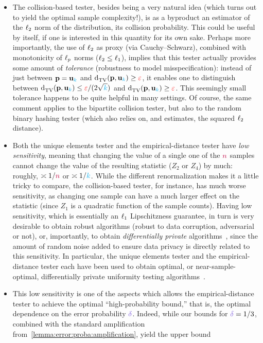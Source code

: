 \begin{itemize}
  \item The collision-based tester, besides being a very natural idea (which turns out to yield the optimal sample complexity!), is as a byproduct an estimator of the $\lp[2]$ norm of the distribution, \ie  its collision probability. This could be useful by itself, if one is interested in this quantity for its own sake. Perhaps more importantly, the use of $\lp[2]$ as proxy (via Cauchy--Schwarz), combined with monotonicity of $\lp[p]$ norms ($\lp[2]\leq \lp[1]$), implies that this tester actually provides some amount of \emph{tolerance} (robustness to model misspecification): instead of just between $\p=\uniform_\ab$ and $\totalvardist{\p}{\uniform_\ab} \geq \dst$, it enables one to distinguish between $\totalvardist{\p}{\uniform_\ab} \leq \dst/(2\sqrt{\ab})$ and $\totalvardist{\p}{\uniform_\ab} \geq \dst$. This seemingly small tolerance happens to be quite helpful in many settings. Of course, the same comment applies to the bipartite collision tester, but also to the random binary hashing tester (which also relies on, and estimates, the squared $\lp[2]$ distance).
  \item Both the unique elements tester and the empirical-distance tester have \emph{low sensitivity}, meaning that changing the value of a single one of the $\ns$ samples cannot change the value of the resulting statistic ($Z_2$ or $Z_4$) by much: roughly, $\asymp 1/\ns$ or $\asymp 1/\ab$. While the different renormalization makes it a little tricky to compare, the collision-based tester, for instance, has much worse sensitivity, as changing one sample can have a much larger effect on the statistic (since $Z_1$ is a quadratic function of the sample counts). Having low sensitivity, which is essentially an $\lp[1]$ Lipschitzness guarantee, in turn is very desirable to obtain robust algorithms (\ie robust to data corruption, adversarial or not), or, importantly, to obtain \emph{differentially private} algorithms~\citep{DworkMNS06}, since the amount of random noise added to ensure data privacy is directly related to this sensitivity. In particular, the unique elements tester and the empirical-distance tester each have been used to obtain optimal, or near-sample-optimal, differentially private uniformity testing algorithms~\citep{AcharyaSZ18,AliakbarpourDR18}.
  \item This low sensitivity is one of the aspects which allows the empirical-distance tester to achieve the optimal ``high-probability bound,'' that is, the optimal dependence on the error probability $\errprob$. Indeed, while our bounds for $\errprob=1/3$, combined with the standard amplification from~\cref{lemma:error:proba:amplification}, yield the upper bound

\end{itemize}
